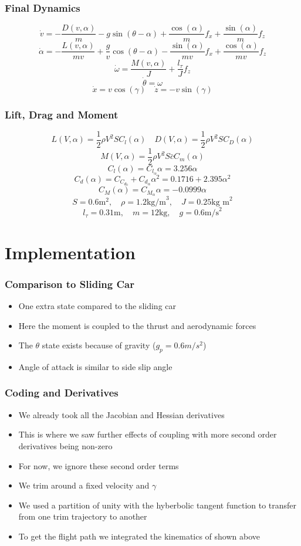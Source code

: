 \documentclass{beamer}
\begin{document}
    \begin{frame}
        \frametitle{Final Dynamics}
        \[\dot{v}=-\frac{D(v,\alpha)}{m}-g\sin(\theta-\alpha)+\frac{\cos(\alpha)}{m}f_x+\frac{\sin(\alpha)}{m}f_z\]
        \[\dot{\alpha}=-\frac{L(v,\alpha)}{mv}+\frac{g}{v}\cos(\theta-\alpha)-\frac{\sin(\alpha)}{mv}f_x+\frac{\cos(\alpha)}{mv}f_z\]
        \[\dot{\omega}=\frac{M(v,\alpha)}{J}+\frac{l_{\tau}}{J}f_z\]
        \[\dot{\theta}=\omega\]
        \[\dot{x}=v\cos(\gamma)\quad \dot{z}=-v\sin(\gamma)\]
    \end{frame}
    \begin{frame}
        \frametitle{Lift, Drag and Moment}
        \[L(V,\alpha)=\frac{1}{2}\rho V^2 SC_l(\alpha)\quad D(V,\alpha)=\frac{1}{2}\rho V^2SC_D(\alpha)\]
        \[M(V,\alpha)=\frac{1}{2}\rho V^2S\bar{c}C_m(\alpha)\]
        \[C_l(\alpha)=C_{l_\alpha}\alpha=3.256\alpha\]
        \[C_d(\alpha)=C_{C_{d_0}}+C_{d_\alpha}\alpha^2=0.1716+2.395\alpha^2\]
        \[C_M(\alpha)=C_{M_\alpha}\alpha=-0.0999\alpha\]
        \[S=0.6 \text{m}^2,\quad \rho=1.2 \text{kg/m}^3,\quad J=0.25 \text{kg m}^2\]
        \[l_\tau=0.31\text{m},\quad m=12\text{kg},\quad g=0.6\text{m/s}^2\]
    \end{frame}

    
    \section{Implementation}
    \begin{frame}
        \frametitle{Comparison to Sliding Car}
        \begin{itemize}
            \item One extra state compared to the sliding car
            \item Here the moment is coupled to the thrust and aerodynamic forces
            \item The $\theta$ state exists because of gravity ($g_p=0.6 m/s^2$)
            \item Angle of attack is similar to side slip angle
        \end{itemize}
    \end{frame}

    \begin{frame}
        \frametitle{Coding and Derivatives}
        \begin{itemize}
            \item We already took all the Jacobian and Hessian derivatives
            \item This is where we saw further effects of coupling with more second order derivatives being non-zero
            \item For now, we ignore these second order terms
            \item We trim around a fixed velocity and $\gamma$
            \item We used a partition of unity with the hyberbolic tangent function to transfer from one trim trajectory to another
            \item To get the flight path we integrated the kinematics of shown above
        \end{itemize}
    \end{frame}
\end{document}

